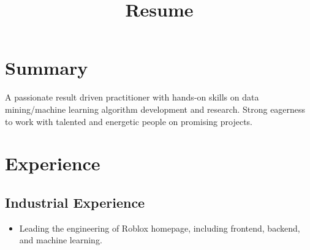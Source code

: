 \documentclass[11pt,a4paper,sans]{moderncv}
\title{Resume}               %
\begin{document}
\maketitle



\vspace{-0.2in}
\section{Summary}
A passionate result driven practitioner with hands-on skills on data mining/machine learning algorithm development and research.
Strong eagerness to work with talented and energetic people on promising projects.


\section{Experience}

\subsection{Industrial Experience}
{
  \begin{itemize} %
    \item Leading the engineering of Roblox homepage, including frontend, backend, and machine learning. 
  \end{itemize}
}
\end{document}
